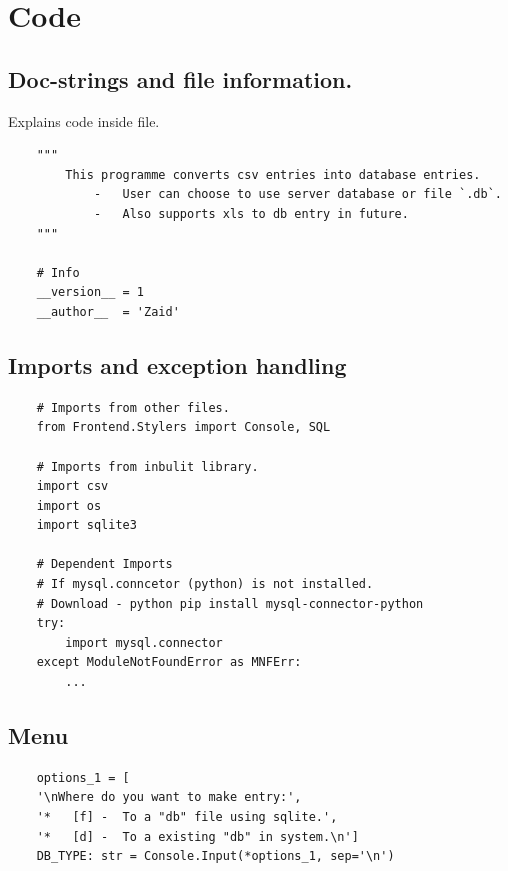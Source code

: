\documentclass[12pt,a4paper]{report}
\begin{document}
        
        
\newpage

    \chapter{Code}
        \vspace{3cm}
        \section{Doc-strings and file information.} 
        Explains code inside file.
        \begin{verbatim}    
    """
        This programme converts csv entries into database entries.
            -   User can choose to use server database or file `.db`.
            -   Also supports xls to db entry in future.
    """
        
    # Info
    __version__ = 1
    __author__  = 'Zaid'
        \end{verbatim}
\newpage

        \section{Imports and exception handling}
        \begin{verbatim}
    # Imports from other files.
    from Frontend.Stylers import Console, SQL
    
    # Imports from inbulit library.
    import csv
    import os
    import sqlite3
    
    # Dependent Imports
    # If mysql.conncetor (python) is not installed.
    # Download - python pip install mysql-connector-python
    try:
        import mysql.connector
    except ModuleNotFoundError as MNFErr:
        ...
        \end{verbatim}
        \section{Menu}
        \begin{verbatim}
    options_1 = [
    '\nWhere do you want to make entry:',
    '*   [f] -  To a "db" file using sqlite.',
    '*   [d] -  To a existing "db" in system.\n']
    DB_TYPE: str = Console.Input(*options_1, sep='\n')
        \end{verbatim}  
\newpage
\end{document}
